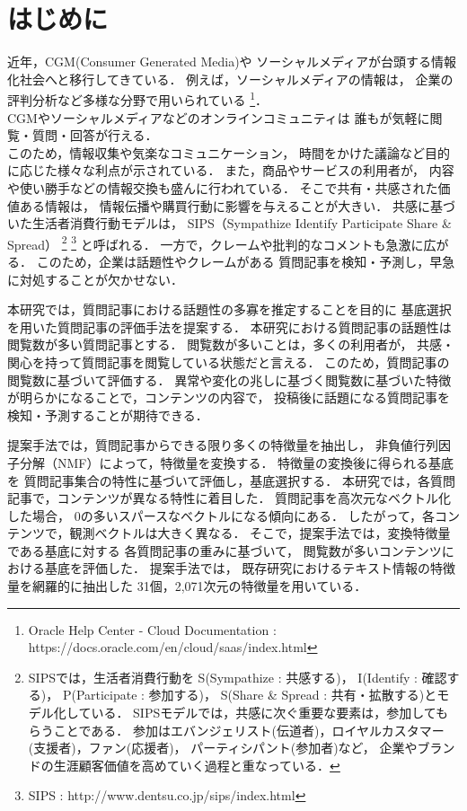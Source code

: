 \documentclass[12pt,a4paper,twocolumn,twoside]{jsik}
\begin{document}
\section{はじめに}
近年，CGM(Consumer Generated Media)や
ソーシャルメディアが台頭する情報化社会へと移行してきている．
%
例えば，ソーシャルメディアの情報は，
企業の評判分析など多様な分野で用いられている
\footnote{Oracle Help Center - Cloud Documentation : \\
https://docs.oracle.com/en/cloud/saas/index.html}．\\
%
CGMやソーシャルメディアなどのオンラインコミュニティは
誰もが気軽に閲覧・質問・回答が行える．\\
このため，情報収集や気楽なコミュニケーション，
時間をかけた議論など目的に応じた様々な利点が示されている．
%
また，商品やサービスの利用者が，
内容や使い勝手などの情報交換も盛んに行われている．
%
そこで共有・共感された価値ある情報は，
情報伝播や購買行動に影響を与えることが大きい．
%
共感に基づいた生活者消費行動モデルは，
SIPS（Sympathize Identify Participate Share \& Spread）
\cite{SIPS}
\footnote{
SIPSでは，生活者消費行動を
S(Sympathize : 共感する)，
I(Identify : 確認する)，
P(Participate : 参加する)，
S(Share \& Spread : 共有・拡散する)とモデル化している．
SIPSモデルでは，共感に次ぐ重要な要素は，参加してもらうことである．
参加はエバンジェリスト(伝道者)，ロイヤルカスタマー(支援者)，ファン(応援者)，
パーティシパント(参加者)など，
企業やブランドの生涯顧客価値を高めていく過程と重なっている．
}
\footnote{
SIPS : http://www.dentsu.co.jp/sips/index.html
}
と呼ばれる．
%
一方で，クレームや批判的なコメントも急激に広がる．
%
このため，企業は話題性やクレームがある
質問記事を検知・予測し，早急に対処することが欠かせない．

本研究では，質問記事における話題性の多寡を推定することを目的に
基底選択を用いた質問記事の評価手法を提案する．
%
本研究における質問記事の話題性は閲覧数が多い質問記事とする．
閲覧数が多いことは，多くの利用者が，
共感・関心を持って質問記事を閲覧している状態だと言える．
このため，質問記事の閲覧数に基づいて評価する．
%
異常や変化の兆しに基づく閲覧数に基づいた特徴が明らかになることで，コンテンツの内容で，
投稿後に話題になる質問記事を検知・予測することが期待できる．

提案手法では，質問記事からできる限り多くの特徴量を抽出し，
非負値行列因子分解（NMF）によって，特徴量を変換する．
%
特徴量の変換後に得られる基底を
質問記事集合の特性に基づいて評価し，基底選択する．
%
本研究では，各質問記事で，コンテンツが異なる特性に着目した．
質問記事を高次元なベクトル化した場合，
0の多いスパースなベクトルになる傾向にある．
したがって，各コンテンツで，観測ベクトルは大きく異なる．
%
そこで，提案手法では，変換特徴量である基底に対する
各質問記事の重みに基づいて，
閲覧数が多いコンテンツにおける基底を評価した．
%
提案手法では，
既存研究におけるテキスト情報の特徴量を網羅的に抽出した
31個，2,071次元の特徴量を用いている．
\end{document}
